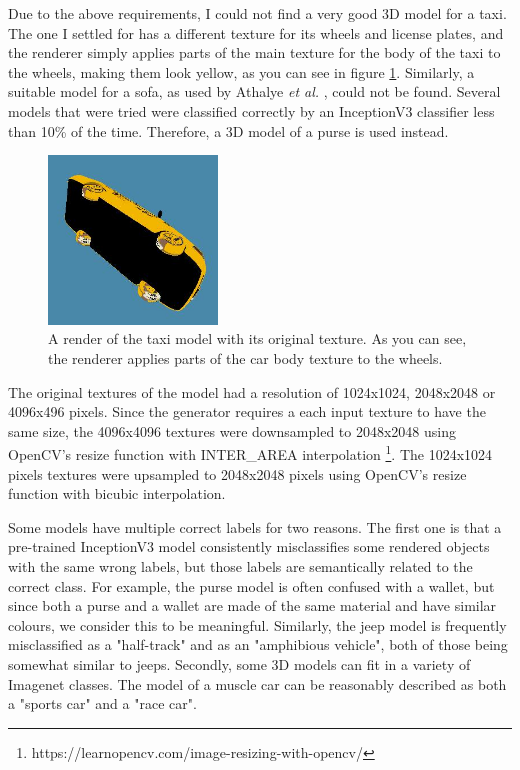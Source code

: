 Due to the above requirements, I could not find a very good 3D model for a taxi. The one I settled for has a different texture for its wheels and license plates, and the renderer simply applies parts of the main texture for the body of the taxi to the wheels, making them look yellow, as you can see in figure \ref{fig:taxi}. Similarly, a suitable model for a sofa, as used by Athalye \textit{et al.} \cite{athalye}, could not be found. Several models that were tried were classified correctly by an InceptionV3 classifier less than 10\% of the time. Therefore, a 3D model of a purse is used instead.

\begin{figure}[ht]
    \centering
    \includegraphics[width=0.4\textwidth]{graphics/taxi.jpg}
    \caption{A render of the taxi model with its original texture. As you can see, the renderer applies parts of the car body texture to the wheels.}
    \label{fig:taxi}
\end{figure}

The original textures of the model had a resolution of 1024x1024, 2048x2048 or 4096x496 pixels. Since the generator requires a each input texture to have the same size, the 4096x4096 textures were downsampled to 2048x2048 using OpenCV's resize function with INTER\_AREA interpolation \footnote{https://learnopencv.com/image-resizing-with-opencv/}. The 1024x1024 pixels textures were upsampled to 2048x2048 pixels using OpenCV's resize function with bicubic interpolation.

Some models have multiple correct labels for two reasons. The first one is that a pre-trained InceptionV3 \cite{inceptionv3} model consistently misclassifies some rendered objects with the same wrong labels, but those labels are semantically related to the correct class. For example, the purse model is often confused with a wallet, but since both a purse and a wallet are made of the same material and have similar colours, we consider this to be meaningful. Similarly, the jeep model is frequently misclassified as a "half-track" and as an "amphibious vehicle", both of those being somewhat similar to jeeps. Secondly, some 3D models can fit in a variety of Imagenet classes. The model of a muscle car can be reasonably described as both a "sports car" and a "race car".

